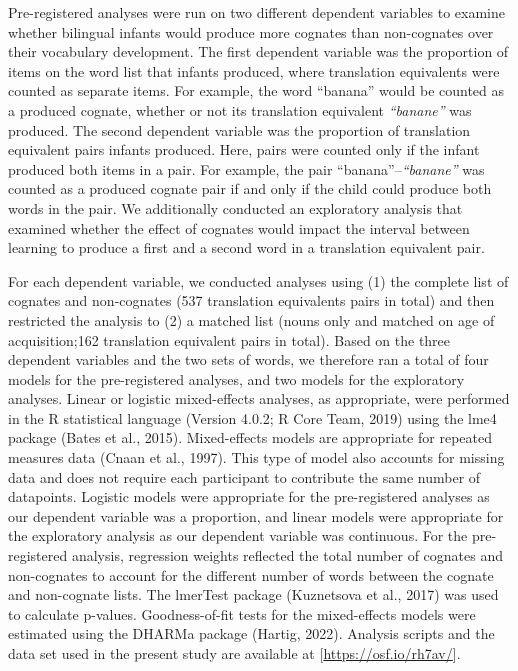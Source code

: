 \documentclass[
  ,man,floatsintext]{apa6}
\begin{document}
Pre-registered analyses were run on two different dependent variables to examine whether bilingual infants would produce more cognates than non-cognates over their vocabulary development. The first dependent variable was the proportion of items on the word list that infants produced, where translation equivalents were counted as separate items. For example, the word ``banana'' would be counted as a produced cognate, whether or not its translation equivalent \emph{``banane''} was produced. The second dependent variable was the proportion of translation equivalent pairs infants produced. Here, pairs were counted only if the infant produced both items in a pair. For example, the pair ``banana''--\emph{``banane''} was counted as a produced cognate pair if and only if the child could produce both words in the pair. We additionally conducted an exploratory analysis that examined whether the effect of cognates would impact the interval between learning to produce a first and a second word in a translation equivalent pair.

For each dependent variable, we conducted analyses using (1) the complete list of cognates and non-cognates (537 translation equivalents pairs in total) and then restricted the analysis to (2) a matched list (nouns only and matched on age of acquisition;162 translation equivalent pairs in total). Based on the three dependent variables and the two sets of words, we therefore ran a total of four models for the pre-registered analyses, and two models for the exploratory analyses. Linear or logistic mixed-effects analyses, as appropriate, were performed in the R statistical language (Version 4.0.2; R Core Team, 2019) using the lme4 package (Bates et al., 2015). Mixed-effects models are appropriate for repeated measures data (Cnaan et al., 1997). This type of model also accounts for missing data and does not require each participant to contribute the same number of datapoints. Logistic models were appropriate for the pre-registered analyses as our dependent variable was a proportion, and linear models were appropriate for the exploratory analysis as our dependent variable was continuous. For the pre-registered analysis, regression weights reflected the total number of cognates and non-cognates to account for the different number of words between the cognate and non-cognate lists. The lmerTest package (Kuznetsova et al., 2017) was used to calculate p-values. Goodness-of-fit tests for the mixed-effects models were estimated using the DHARMa package (Hartig, 2022). Analysis scripts and the data set used in the present study are available at {[}\url{https://osf.io/rh7av/}{]}.
\end{document}
